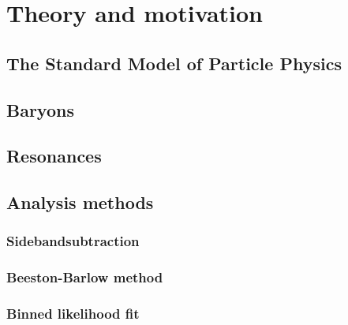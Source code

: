 \chapter{Theory and motivation}
\label{sec:Theory}

\section{The Standard Model of Particle Physics}

\section{Baryons}

\section{Resonances}

\section{Analysis methods}

\subsection{Sidebandsubtraction}
\label{sec:Sidebandsubtraction}

\subsection{Beeston-Barlow method}

\subsection{Binned likelihood fit}